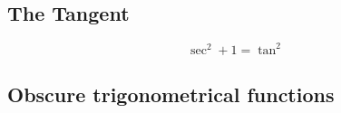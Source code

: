 \documentclass[main.tex]{subfiles}
\begin{document}



\subsection{The Tangent}

$$\sec^2 + 1= \tan^2$$




\subsection{Obscure trigonometrical functions}

\end{document}
